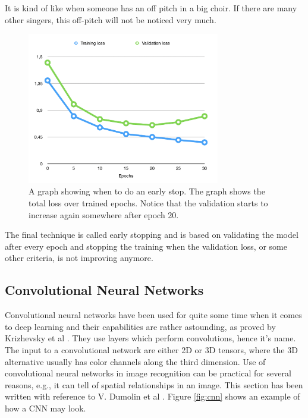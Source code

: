 It is kind of like when someone has an off pitch in a big choir. If there are many other singers, this off-pitch will not be noticed very much.

\begin{figure}[hbtp]
\begin{center}
\includegraphics[width = 0.75\textwidth]{./Images/early_stop.jpg} 
\caption{A graph showing when to do an early stop. The graph shows the total loss over trained epochs. Notice that the validation starts to increase again somewhere after epoch 20.}
\end{center}
\end{figure}

The final technique is called early stopping and is based on validating the model after every epoch and stopping the training when the validation loss, or some other criteria, is not improving anymore.


 \subsection{Convolutional Neural Networks}

 Convolutional neural networks have been used for quite some time when it comes to deep learning and their capabilities are rather astounding, as proved by Krizhevsky et al \cite{NIPS2012_4824}.  They use layers which perform convolutions, hence it's name.  The input to a convolutional network are either 2D or 3D tensors, where the 3D alternative usually has color channels along the third dimension. Use of convolutional neural networks in image recognition  can be practical for several reasons, e.g., it can tell of spatial relationships in an image. This section has been written with reference to V. Dumolin et al \cite{convArit}. Figure \ref{fig:cnn} shows an example of how a CNN may look.
 
